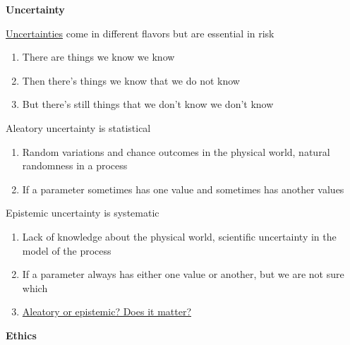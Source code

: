 \documentclass[aspectratio=1610,pdftex,dvipsnames,compress,xcolor={dvipsnames}]{beamer}
\begin{document}
\begin{frame}[plain]{}
    \centering\LARGE\textbf{Uncertainty}
\end{frame}


\addtocounter{framenumber}{-1}
\begin{frame}{\href{https://uxdesign.cc/the-knowns-and-unknowns-framework-for-design-thinking-6537787de2c5}{Uncertainties} come in different flavors but are essential in risk}
    \begin{enumerate}[series=outerlist,topsep=0pt,itemsep=21pt,leftmargin=*,label=(\arabic*)]
        \item[]There are things we know we know
        \item[]Then there’s things we know that we do not know
        \item[]But there’s still things that we don’t know we don’t know
    \end{enumerate}
\end{frame}


\begin{frame}{Aleatory uncertainty is statistical}
    \begin{enumerate}[series=outerlist,topsep=0pt,itemsep=21pt,leftmargin=*,label=(\arabic*)]
        \item[]Random variations and chance outcomes in the physical world, natural randomness in a process
        \item[]If a parameter sometimes has one value and sometimes has another values
    \end{enumerate}
\end{frame}


\begin{frame}{Epistemic uncertainty is systematic}
    \begin{enumerate}[series=outerlist,topsep=0pt,itemsep=21pt,leftmargin=*,label=(\arabic*)]
        \item[]Lack of knowledge about the physical world, scientific uncertainty in the model of the process
        \item[]If a parameter always has either one value or another, but we are not sure which
        \item[]\href{https://www.sciencedirect.com/science/article/abs/pii/S0167473008000556}{Aleatory or epistemic? Does it matter?}
    \end{enumerate}
\end{frame}


\begin{frame}[plain]{}
    \centering\LARGE\textbf{Ethics}
\end{frame}
\end{document}
